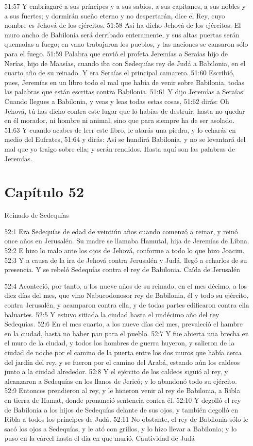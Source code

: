 51:57 Y embriagaré a sus príncipes y a sus sabios, a sus capitanes, a sus nobles y a sus fuertes; y dormirán sueño eterno y no despertarán, dice el Rey, cuyo nombre es Jehová de los ejércitos. 
51:58 Así ha dicho Jehová de los ejércitos: El muro ancho de Babilonia será derribado enteramente, y sus altas puertas serán quemadas a fuego; en vano trabajaron los pueblos, y las naciones se cansaron sólo para el fuego. 
51:59 Palabra que envió el profeta Jeremías a Seraías hijo de Nerías, hijo de Maasías, cuando iba con Sedequías rey de Judá a Babilonia, en el cuarto año de su reinado. Y era Seraías el principal camarero. 
51:60 Escribió, pues, Jeremías en un libro todo el mal que había de venir sobre Babilonia, todas las palabras que están escritas contra Babilonia. 
51:61 Y dijo Jeremías a Seraías: Cuando llegues a Babilonia, y veas y leas todas estas cosas, 
51:62 dirás: Oh Jehová, tú has dicho contra este lugar que lo habías de destruir, hasta no quedar en él morador, ni hombre ni animal, sino que para siempre ha de ser asolado. 
51:63 Y cuando acabes de leer este libro, le atarás una piedra, y lo echarás en medio del Eufrates, 
51:64 y dirás: Así se hundirá Babilonia, y no se levantará del mal que yo traigo sobre ella; y serán rendidos. Hasta aquí son las palabras de Jeremías. 
\section*{Capítulo 52 }
Reinado de Sedequías 
 
52:1 Era Sedequías de edad de veintiún años cuando comenzó a reinar, y reinó once años en Jerusalén. Su madre se llamaba Hamutal, hija de Jeremías de Libna. 
52:2 E hizo lo malo ante los ojos de Jehová, conforme a todo lo que hizo Joacim. 
52:3 Y a causa de la ira de Jehová contra Jerusalén y Judá, llegó a echarlos de su presencia. Y se rebeló Sedequías contra el rey de Babilonia. 
Caída de Jerusalén 

52:4 Aconteció, por tanto, a los nueve años de su reinado, en el mes décimo, a los diez días del mes, que vino Nabucodonosor rey de Babilonia, él y todo su ejército, contra Jerusalén, y acamparon contra ella, y de todas partes edificaron contra ella baluartes. 
52:5 Y estuvo sitiada la ciudad hasta el undécimo año del rey Sedequías. 
52:6 En el mes cuarto, a los nueve días del mes, prevaleció el hambre en la ciudad, hasta no haber pan para el pueblo. 
52:7 Y fue abierta una brecha en el muro de la ciudad, y todos los hombres de guerra huyeron, y salieron de la ciudad de noche por el camino de la puerta entre los dos muros que había cerca del jardín del rey, y se fueron por el camino del Arabá, estando aún los caldeos junto a la ciudad alrededor. 
52:8 Y el ejército de los caldeos siguió al rey, y alcanzaron a Sedequías en los llanos de Jericó; y lo abandonó todo su ejército. 
52:9 Entonces prendieron al rey, y le hicieron venir al rey de Babilonia, a Ribla en tierra de Hamat, donde pronunció sentencia contra él. 
52:10 Y degolló el rey de Babilonia a los hijos de Sedequías delante de sus ojos, y también degolló en Ribla a todos los príncipes de Judá. 
52:11 No obstante, el rey de Babilonia sólo le sacó los ojos a Sedequías, y le ató con grillos, y lo hizo llevar a Babilonia; y lo puso en la cárcel hasta el día en que murió. 
Cautividad de Judá 


